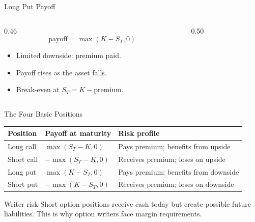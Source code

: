 \documentclass[aspectratio=169,11pt]{beamer}
\begin{document}
\begin{frame}{Long Put Payoff}
    \begin{columns}[T]
        \begin{column}{0.46\textwidth}
            \[
                \text{payoff}=\max(K-S_T,0)
            \]
            \begin{itemize}
                \item Limited downside: premium paid.
                \item Payoff rises as the asset falls.
                \item Break-even at \(S_T=K-\text{premium}\).
            \end{itemize}
        \end{column}
        \begin{column}{0.50\textwidth}
            \begin{center}
            \end{center}
        \end{column}
    \end{columns}
\end{frame}

\begin{frame}{The Four Basic Positions}
    \small
    \begin{center}
    \begin{tabular}{lll}
        \toprule
        Position & Payoff at maturity & Risk profile \\
        \midrule
        Long call & \(\max(S_T-K,0)\) & Pays premium; benefits from upside \\
        Short call & \(-\max(S_T-K,0)\) & Receives premium; loses on upside \\
        Long put & \(\max(K-S_T,0)\) & Pays premium; benefits from downside \\
        Short put & \(-\max(K-S_T,0)\) & Receives premium; loses on downside \\
        \bottomrule
    \end{tabular}
    \end{center}

    \vspace{0.8em}
    \begin{alertblock}{Writer risk}
        Short option positions receive cash today but create possible future liabilities.
        This is why option writers face margin requirements.
    \end{alertblock}
\end{frame}
\end{document}
